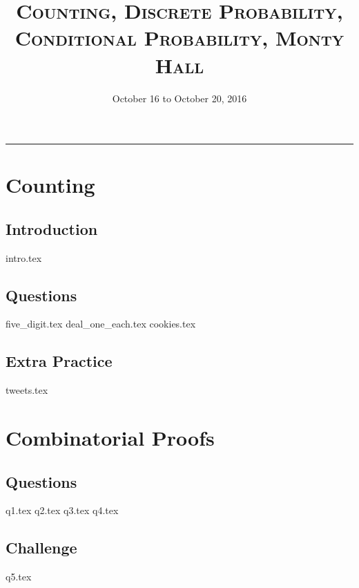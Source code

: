 \documentclass{exam}
\title{\textsc{Counting, Discrete Probability, Conditional Probability, Monty Hall}}
\date{October 16 to October 20, 2016}
\begin{document}
\maketitle
\rule{\textwidth}{0.15em}
\fontsize{12}{15}\selectfont
\thispagestyle{empty}

\section{Counting}
\subsection{Introduction}
{intro.tex}
\subsection{Questions}
\begin{questions}
{five_digit.tex}
{deal_one_each.tex}
{cookies.tex}
\end{questions}
\subsection{Extra Practice}
\begin{questions}
{tweets.tex}
\end{questions}

\section{Combinatorial Proofs}
\subsection{Questions}
\begin{questions}
{q1.tex}
{q2.tex}
{q3.tex}
{q4.tex}
\end{questions}
\subsection{Challenge}
\begin{questions}
{q5.tex}
\end{questions}
\end{document}
